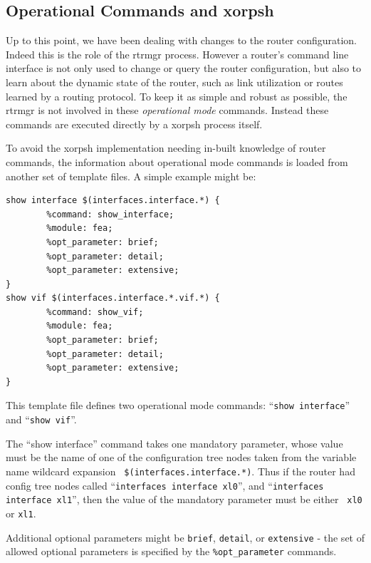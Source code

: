 \documentclass[11pt]{article}
\begin{document}
\subsection{Operational Commands and xorpsh}
Up to this point, we have been dealing with changes to the router
configuration.  Indeed this is the role of the rtrmgr process.
However a router's command line interface is not only used to change
or query the router configuration, but also to learn about the dynamic
state of the router, such as link utilization or routes learned by a
routing protocol.  To keep it as simple and robust as possible, the
rtrmgr is not involved in these \textit{operational mode} commands.
Instead these commands are executed directly by a xorpsh process
itself.

To avoid the xorpsh implementation needing in-built knowledge of
router commands, the information about operational mode commands is
loaded from another set of template files.  A simple example might be:
\begin{verbatim}
show interface $(interfaces.interface.*) {
        %command: show_interface;
        %module: fea;
        %opt_parameter: brief;
        %opt_parameter: detail;
        %opt_parameter: extensive;
}
show vif $(interfaces.interface.*.vif.*) {
        %command: show_vif;
        %module: fea;
        %opt_parameter: brief;
        %opt_parameter: detail;
        %opt_parameter: extensive;
}
\end{verbatim}
This template file defines two operational mode commands: ``{\tt show
interface}'' and ``{\tt show vif}''.

The ``show interface'' command takes one mandatory parameter, whose
value must be the name of one of the configuration tree nodes taken
from the variable name wildcard expansion {\tt
\$(interfaces.interface.*)}.  Thus if the router had config tree nodes
called ``{\tt interfaces interface xl0}'', and ``{\tt interfaces interface
xl1}'', then the value of the mandatory parameter must be either {\tt
xl0} or {\tt xl1}.  

Additional optional parameters might be {\tt brief}, {\tt detail}, or
{\tt extensive} - the set of allowed optional parameters is specified
by the {\tt \%opt\_parameter} commands.  
\end{document}
